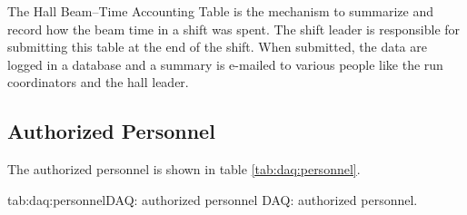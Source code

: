 {{\par 
The Hall Beam--Time Accounting Table is the mechanism
to summarize and record
how the beam time in a shift was spent.  
The shift leader is responsible for
submitting this table at the end of the shift.
When submitted, the data are 
logged in a database
and a summary is e-mailed to various people like the
run coordinators and the hall leader.
}

\infolevltone{\newpage}
\begin{safetyen}{10}{15}
\section{Authorized  Personnel} 
\end{safetyen}
The authorized personnel is shown in table \ref{tab:daq:personnel}.
\begin{namestab}{tab:daq:personnel}{DAQ: authorized personnel}{%
      DAQ: authorized personnel.}
\end{namestab}

} 
